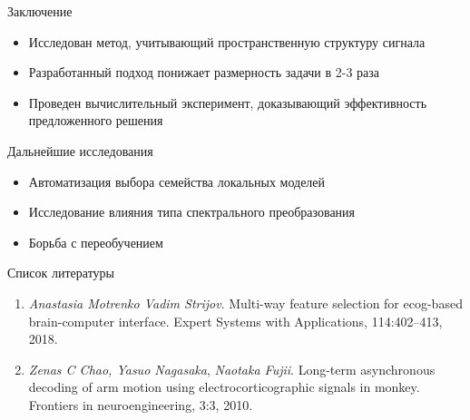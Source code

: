 \documentclass[9pt,pdf,hyperref={unicode}]{beamer}
\begin{document}
\begin{frame}{Заключение}
\begin{itemize}
	\item Исследован метод, учитывающий пространственную структуру сигнала
	\item Разработанный подход понижает размерность задачи в 2-3 раза
	\item Проведен вычислительный эксперимент, доказывающий эффективность предложенного решения
\end{itemize}
\end{frame}
\begin{frame}{Дальнейшие исследования}
\begin{itemize}
	\item  Автоматизация выбора семейства локальных моделей
	\item Исследование влияния типа спектрального преобразования
	\item Борьба с переобучением
\end{itemize}
\end{frame}
\begin{frame}{Список литературы}
\begin{enumerate}
	\item \textit{Anastasia Motrenko Vadim Strijov}. Multi-way feature selection for ecog-based brain-computer
	interface. Expert Systems with Applications, 114:402–413, 2018.
	\item \textit{Zenas C Chao, Yasuo Nagasaka},  \textit{Naotaka Fujii}. Long-term asynchronous decoding of arm
	motion using electrocorticographic signals in monkey. Frontiers in neuroengineering, 3:3, 2010.
\end{enumerate}
\end{frame}
\end{document}
